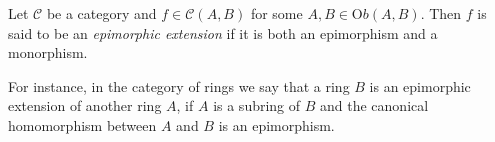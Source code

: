 \documentclass[12pt]{article}
\begin{document}
Let $\mathcal C$ be a category and $f\in \mathcal C(A,B)$ for some $A,B\in\mathrm Ob(A,B)$. Then $f$ is said to be 
an \emph{epimorphic extension} if it is both an epimorphism and a monorphism.

For instance, in the category of rings we say that a ring $B$ is an epimorphic extension of another ring $A$, if $A$ is a subring of $B$ and the canonical homomorphism between $A$ and $B$ is an epimorphism.
\end{document}
